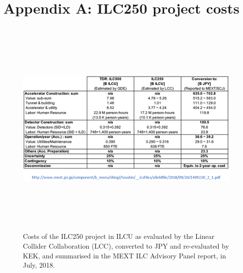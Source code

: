 \documentclass[%
reprint,
 floatfix,
 amsmath,amssymb,
 aps,
]{revtex4-1}
\begin{document}
\newpage

%


\vspace{-.3cm}

\onecolumngrid
\newpage

\appendix


\section*{\label{Appendix1} \Large{Appendix A: ILC250 project costs}} 

\begin{figure}[ht]
 \begin{center}
 \includegraphics[width=18cm, height=11cm]{figures/Cost.png}
\caption{Costs of the ILC250 project in ILCU as evaluated by the Linear Collider Collaboration (LCC), converted to JPY and re-evaluated by KEK, and summarised in the MEXT ILC Advisory Panel report, in July, 2018.
 \label{Cost}}
 \end{center}
 \end{figure}
\end{document}
